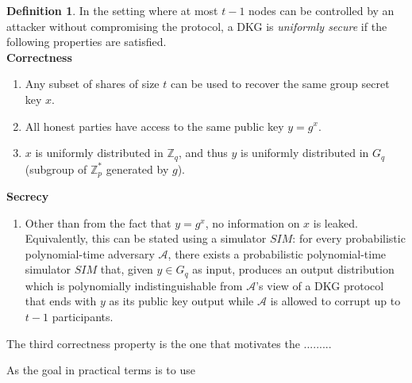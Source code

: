 \documentclass[11pt]{article}
\theoremstyle{definition}
\newtheorem{definition}[theorem]{Definition}
\theoremstyle{remark}
\begin{document}
\begin{definition}
In the setting where at most $t - 1$ nodes can be controlled by an attacker without compromising the protocol, a DKG is \textit{uniformly secure} if the following properties are satisfied.\\

\textbf{Correctness}
\begin{enumerate}
\item Any subset of shares of size $t$ can be used to recover the same group secret key $x$.
\item All honest parties have access to the same public key $y = g^x$.
\item $x$ is uniformly distributed in $\mathbb{Z}_q$, and thus $y$ is uniformly distributed in $G_q$ (subgroup of $\mathbb{Z}^*_p$ generated by $g$).
\end{enumerate}

\textbf{Secrecy}
\begin{enumerate}
\item Other than from the fact that $y = g^x$, no information on $x$ is leaked. Equivalently, this can be stated using a simulator $SIM$: for every probabilistic polynomial-time adversary $\mathcal{A}$, there exists a probabilistic polynomial-time simulator $SIM$ that, given $y \in G_q$ as input, produces an output distribution which is polynomially indistinguishable from $\mathcal{A}$'s view of a DKG protocol that ends with $y$ as its public key output while $\mathcal{A}$ is allowed to corrupt up to $t - 1$ participants.
\end{enumerate}
\end{definition}

The third correctness property is the one that motivates the .........


As the goal in practical terms is to use 

\end{document}
